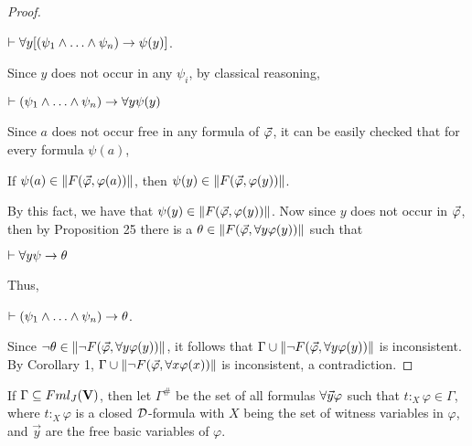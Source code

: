 \begin{proof}
	\begin{center}
		$\teo \todo y [(\psi_{1} \e \dots \e \psi_{n}) \impli \psi(y)]$.
	\end{center}
	

	\qquad Since $y$ does not occur in any $\psi_{i}$, by classical reasoning,
	
	\begin{center}
		$\teo (\psi_{1} \e \dots \e \psi_{n}) \impli \todo y \psi(y)$
	\end{center}
	
	
	\qquad Since $a$ does not occur free in any formula of $\vec{\varphi}$, it can be easily checked that for every formula $\psi(a)$,
	
	\begin{center}
		If $\psi(a) \in \Arrowvert F(\vec{\varphi},\varphi(a)) \Arrowvert$, then $\psi(y) \in \Arrowvert F(\vec{\varphi},\varphi(y)) \Arrowvert$.
	\end{center}
	
	\qquad By this fact, we have that $\psi(y) \in \Arrowvert F(\vec{\varphi},\varphi(y)) \Arrowvert$. Now since $y$ does not occur in $\vec{\varphi}$, then by Proposition 25 there is a $\theta \in \Arrowvert F(\vec{\varphi},\forall y \varphi(y)) \Arrowvert$ such that
	\begin{center}
		$\vdash \forall y\psi \rightarrow \theta$
	\end{center}
Thus,
	
	\begin{center}
		$\teo  (\psi_{1} \e \dots \e \psi_{n})  \impli \theta$.
	\end{center}
	
	
	\qquad Since $\neg\theta \in \Arrowvert \neg F(\vec{\varphi},\forall y \varphi(y)) \Arrowvert$, it follows that $\Gamma \cup \Arrowvert \neg F(\vec{\varphi},\forall y\varphi(y)) \Arrowvert$ is inconsistent. By Corollary 1, $\Gamma \cup \Arrowvert \neg F(\vec{\varphi},\forall x\varphi(x)) \Arrowvert$ is inconsistent, a contradiction.
\end{proof}


\begin{defn}
	If $\Gamma \subseteq Fml_{J}(\textbf{V})$, then let $\Gamma^{\#}$ be the set of all formulas $\forall \vec{y} \varphi$ such that $t$$:_{X}$$\varphi \in \Gamma$, where $t$$:_{X}$$\varphi$ is a closed $\mathcal{D}$-formula with $X$ being the set of witness variables in $\varphi$, and $\vec{y}$ are the free  basic variables of $\varphi$. 
\end{defn}

